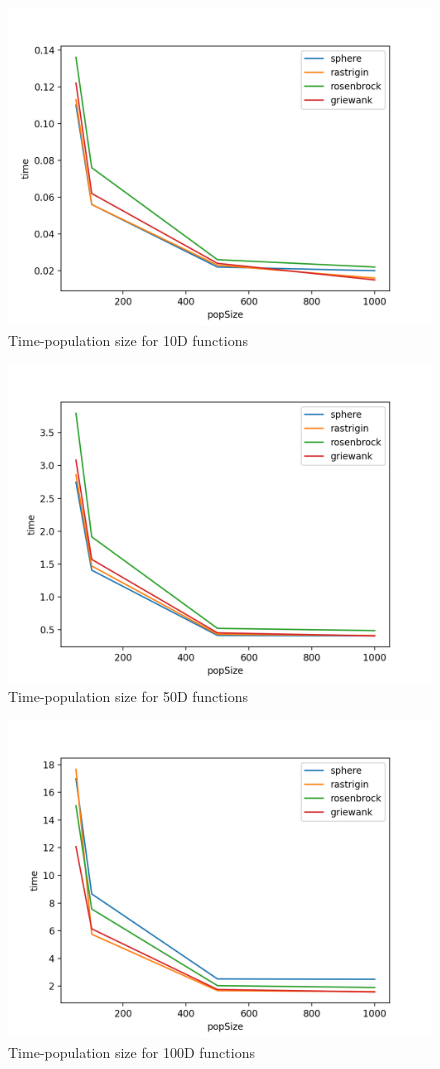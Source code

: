 \documentclass[conference]{IEEEtran}
\begin{document}
\begin{figure}[h]
	\centering
	\includegraphics[width=0.75\linewidth]{img/10D_popSize_time.png}
	\caption{Time-population size for 10D functions}
	\label{fig:10d_popsize_time}
\end{figure}

\begin{figure}[h]
	\centering
	\includegraphics[width=0.75\linewidth]{img/50D_popSize_time.png}
	\caption{Time-population size for 50D functions}
	\label{fig:50d_popsize_time}
\end{figure}

\begin{figure}[h]
	\centering
	\includegraphics[width=0.75\linewidth]{img/100D_popSize_time.png}
	\caption{Time-population size for 100D functions}
	\label{fig:100d_popsize_time}
\end{figure}
\end{document}
